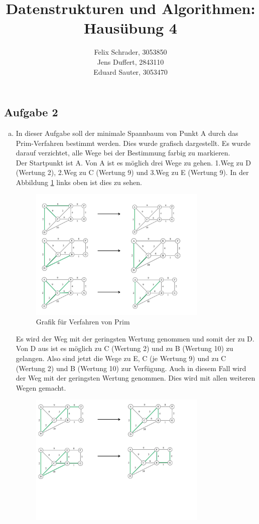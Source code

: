 \documentclass[11pt]{article}
\author{
  Felix Schrader, 3053850 \\ 
  Jens Duffert, 2843110 \\
  Eduard Sauter, 3053470
}
\title{Datenstrukturen und Algorithmen: Haus\"ubung 4}
\begin{document}
\maketitle
\subsection*{Aufgabe 2}
\begin{enumerate}[a)]
\item
In dieser Aufgabe soll der minimale Spannbaum von Punkt A durch das
Prim-Verfahren bestimmt werden. Dies wurde grafisch dargestellt. Es wurde
darauf verzichtet, alle Wege bei der Bestimmung farbig zu markieren.\\
Der Startpunkt ist A. Von A ist es möglich drei Wege zu gehen.
1.Weg zu D (Wertung 2), 2.Weg zu C (Wertung 9) und 3.Weg zu E (Wertung 9).
In der Abbildung \ref{fig:a1} links oben ist dies zu sehen.
\begin{figure}[h!]
	\centering
	\includegraphics[width=0.8\textwidth]{aufgabe2ateil1.png}
	\caption{Grafik für Verfahren von Prim}
	\label{fig:a1}
\end{figure}
Es wird der Weg mit der geringsten Wertung genommen und somit der zu D.
Von D aus ist es möglich zu C (Wertung 2) und zu B (Wertung 10) zu gelangen.
Also sind jetzt die Wege zu E, C (je Wertung 9) und zu C (Wertung 2) und B
(Wertung 10) zur Verfügung. Auch in diesem Fall wird der Weg mit der geringsten
Wertung genommen. Dies wird mit allen weiteren Wegen gemacht.
\begin{figure}[h!]
	\centering
	\includegraphics[width=0.8\textwidth]{aufgabe2ateil2.png}

\end{figure}
\end{enumerate}
\end{document}
